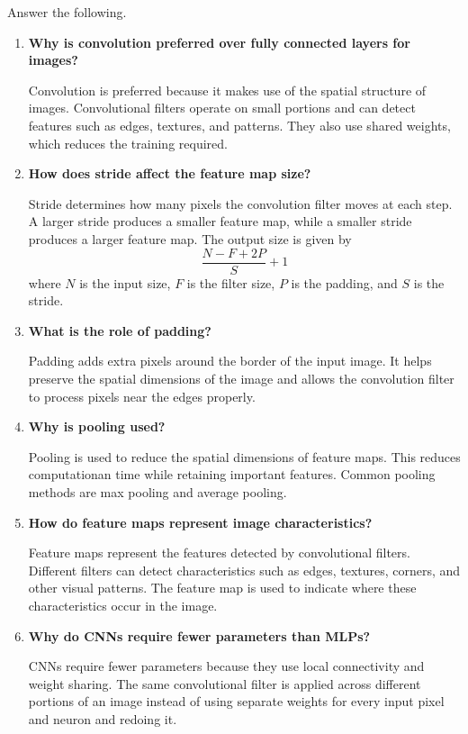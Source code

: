 \documentclass[11pt]{article}
\begin{document}
Answer the following.
\begin{enumerate}
    \item \textbf{Why is convolution preferred over fully connected layers for images?}
    
    Convolution is preferred because it makes use of the spatial structure of images. Convolutional filters operate on small portions and can detect features such as edges, textures, and patterns. They also use shared weights, which reduces the training required.

    \item \textbf{How does stride affect the feature map size?}
    
    Stride determines how many pixels the convolution filter moves at each step. A larger stride produces a smaller feature map, while a smaller stride produces a larger feature map. The output size is given by
    \[
    \frac{N-F+2P}{S}+1
    \]
    where $N$ is the input size, $F$ is the filter size, $P$ is the padding, and $S$ is the stride.

    \item \textbf{What is the role of padding?}
    
    Padding adds extra pixels around the border of the input image. It helps preserve the spatial dimensions of the image and allows the convolution filter to process pixels near the edges properly.

    \item \textbf{Why is pooling used?}
    
    Pooling is used to reduce the spatial dimensions of feature maps. This reduces computationan time while retaining important features. Common pooling methods are max pooling and average pooling.

    \item \textbf{How do feature maps represent image characteristics?}
    
    Feature maps represent the features detected by convolutional filters. Different filters can detect characteristics such as edges, textures, corners, and other visual patterns. The feature map is used to indicate where these characteristics occur in the image.

    \item \textbf{Why do CNNs require fewer parameters than MLPs?}
    
    CNNs require fewer parameters because they use local connectivity and weight sharing. The same convolutional filter is applied across different portions of an image instead of using separate weights for every input pixel and neuron and redoing it. 
\end{enumerate}
\end{document}
